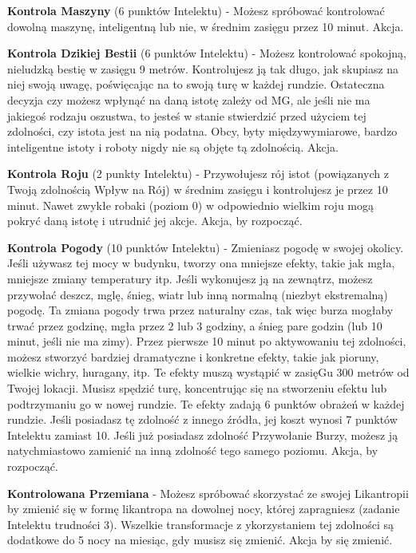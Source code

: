 {\textbf{Kontrola Maszyny}\label{sec:Kontrola Maszyny} (6 punktów Intelektu) - Możesz spróbować kontrolować dowolną maszynę, inteligentną lub nie, w średnim zasięgu przez 10 minut. Akcja.

\textbf{Kontrola Dzikiej Bestii}\label{sec:Kontrola Dzikiej Bestii}  (6 punktów Intelektu) - Możesz kontrolować spokojną, nieludzką bestię w zasięgu 9 metrów. Kontrolujesz ją tak długo, jak skupiasz na niej swoją uwagę, poświęcając na to swoją turę w każdej rundzie. Ostateczna decyzja czy możesz wpłynąć na daną istotę zależy od MG, ale jeśli nie ma jakiegoś rodzaju oszustwa, to jesteś w stanie stwierdzić przed użyciem tej zdolności, czy istota jest na nią podatna. Obcy, byty międzywymiarowe, bardzo inteligentne istoty i roboty nigdy nie są objęte tą zdolnością. Akcja.

\textbf{Kontrola Roju}\label{sec:Kontrola Roju} (2 punkty Intelektu) - Przywołujesz rój istot (powiązanych z Twoją zdolnością Wpływ na Rój) w średnim zasięgu i kontrolujesz je przez 10 minut. Nawet zwykłe robaki (poziom 0) w odpowiednio wielkim roju mogą pokryć daną istotę i utrudnić jej akcje. Akcja, by rozpocząć. 

\textbf{Kontrola Pogody}\label{sec:Kontrola Pogody} (10 punktów Intelektu) - Zmieniasz pogodę w swojej okolicy. Jeśli używasz tej mocy w budynku, tworzy ona mniejsze efekty, takie jak mgła, mniejsze zmiany temperatury itp. Jeśli wykonujesz ją na zewnątrz, możesz przywołać deszcz, mglę, śnieg, wiatr lub inną normalną (niezbyt ekstremalną) pogodę. Ta zmiana pogody trwa przez naturalny czas, tak więc burza mogłaby trwać przez godzinę, mgła przez 2 lub 3 godziny, a śnieg pare godzin (lub 10 minut, jeśli nie ma zimy). Przez pierwsze 10 minut po aktywowaniu tej zdolności, możesz stworzyć bardziej dramatyczne i konkretne efekty, takie jak pioruny, wielkie wichry, huragany, itp. Te efekty muszą wystąpić w zasięGu 300 metrów od Twojej lokacji. Musisz spędzić turę, koncentrując się na stworzeniu efektu lub podtrzymaniu go w nowej rundzie. Te efekty zadają 6 punktów obrażeń w każdej rundzie. Jeśli posiadasz tę zdolność z innego źródła, jej koszt wynosi 7 punktów Intelektu zamiast 10. Jeśli już posiadasz zdolność Przywołanie Burzy, możesz ją natychmiastowo zamienić na inną zdolność tego samego poziomu. Akcja, by rozpocząć.  

\textbf{Kontrolowana Przemiana}\label{sec:Kontrolowana Przemiana} - Możesz spróbować skorzystać ze swojej Likantropii by zmienić się w formę likantropa na dowolnej nocy, której zapragniesz (zadanie Intelektu trudności 3). Wszelkie transformacje z ykorzystaniem tej zdolności są dodatkowe do 5 nocy na miesiąc, gdy musisz się zmienić. Akcja by się zmienić. 

}
